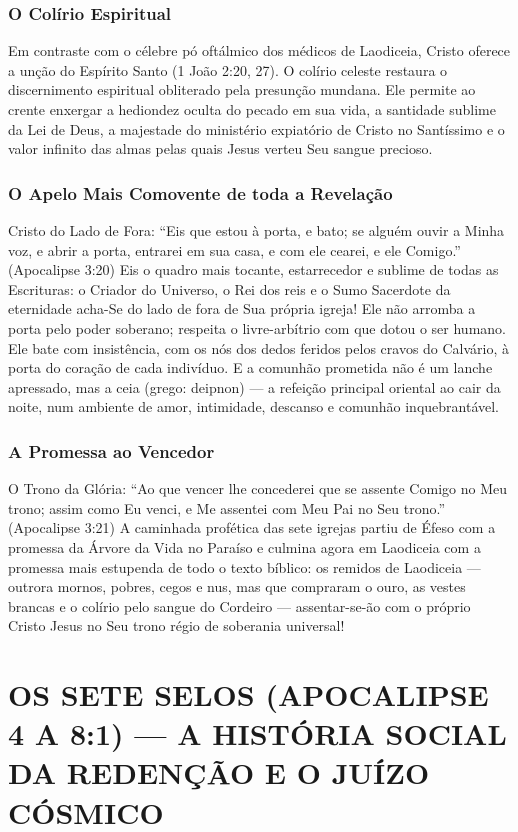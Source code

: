 \subsubsection*{O Colírio Espiritual}
Em contraste com o célebre pó oftálmico dos médicos de Laodiceia, Cristo oferece a unção do Espírito Santo (1 João 2:20, 27). O colírio celeste restaura o discernimento espiritual obliterado pela presunção mundana. Ele permite ao crente enxergar a hediondez oculta do pecado em sua vida, a santidade sublime da Lei de Deus, a majestade do ministério expiatório de Cristo no Santíssimo e o valor infinito das almas pelas quais Jesus verteu Seu sangue precioso.


\subsubsection*{O Apelo Mais Comovente de toda a Revelação}
Cristo do Lado de Fora:
``Eis que estou à porta, e bato; se alguém ouvir a Minha voz, e abrir a porta, entrarei em sua casa, e com ele cearei, e ele Comigo.'' (Apocalipse 3:20)
Eis o quadro mais tocante, estarrecedor e sublime de todas as Escrituras: o Criador do Universo, o Rei dos reis e o Sumo Sacerdote da eternidade acha-Se do lado de fora de Sua própria igreja! Ele não arromba a porta pelo poder soberano; respeita o livre-arbítrio com que dotou o ser humano. Ele bate com insistência, com os nós dos dedos feridos pelos cravos do Calvário, à porta do coração de cada indivíduo. E a comunhão prometida não é um lanche apressado, mas a ceia (grego: deipnon) — a refeição principal oriental ao cair da noite, num ambiente de amor, intimidade, descanso e comunhão inquebrantável.


\subsubsection*{A Promessa ao Vencedor}
O Trono da Glória:
``Ao que vencer lhe concederei que se assente Comigo no Meu trono; assim como Eu venci, e Me assentei com Meu Pai no Seu trono.'' (Apocalipse 3:21)
A caminhada profética das sete igrejas partiu de Éfeso com a promessa da Árvore da Vida no Paraíso e culmina agora em Laodiceia com a promessa mais estupenda de todo o texto bíblico: os remidos de Laodiceia — outrora mornos, pobres, cegos e nus, mas que compraram o ouro, as vestes brancas e o colírio pelo sangue do Cordeiro — assentar-se-ão com o próprio Cristo Jesus no Seu trono régio de soberania universal!


\section{OS SETE SELOS (APOCALIPSE 4 A 8:1) — A HISTÓRIA SOCIAL DA REDENÇÃO E O JUÍZO CÓSMICO}



